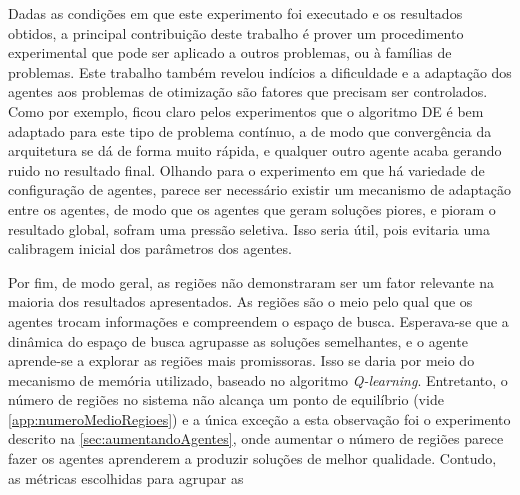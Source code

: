 Dadas as condições em que este experimento foi executado e os resultados obtidos, a principal contribuição deste trabalho é prover um procedimento experimental que pode ser aplicado a outros problemas, ou à famílias de problemas. Este trabalho também revelou indícios a dificuldade e a adaptação dos agentes aos problemas de otimização são fatores que precisam ser controlados. Como por exemplo, ficou claro pelos experimentos que o algoritmo DE é bem adaptado para este tipo de problema contínuo, a de modo que convergência da arquitetura se dá de forma muito rápida, e qualquer outro agente acaba gerando ruido no resultado final. Olhando para o experimento em que há variedade de configuração de agentes, parece ser necessário existir um mecanismo de adaptação entre os agentes, de modo que os agentes que geram soluções piores, e pioram o resultado global, sofram uma pressão seletiva. Isso seria útil, pois evitaria uma calibragem inicial dos parâmetros dos agentes. 

Por fim, de modo geral, as regiões não demonstraram ser um fator relevante na maioria dos resultados apresentados. As regiões são o meio pelo qual que os agentes trocam informações e compreendem o espaço de busca. Esperava-se que a dinâmica do espaço de busca agrupasse as soluções semelhantes, e o agente aprende-se a explorar as regiões mais promissoras. Isso se daria por meio do mecanismo de memória utilizado, baseado no algoritmo \textit{Q-learning}. Entretanto, o número de regiões no sistema não alcança um ponto de equilíbrio (vide \autoref{app:numeroMedioRegioes}) e a única exceção a esta observação foi o experimento descrito na \autoref{sec:aumentandoAgentes}, onde aumentar o número de regiões parece fazer os agentes aprenderem a produzir soluções de melhor qualidade. Contudo, as métricas escolhidas para agrupar as 